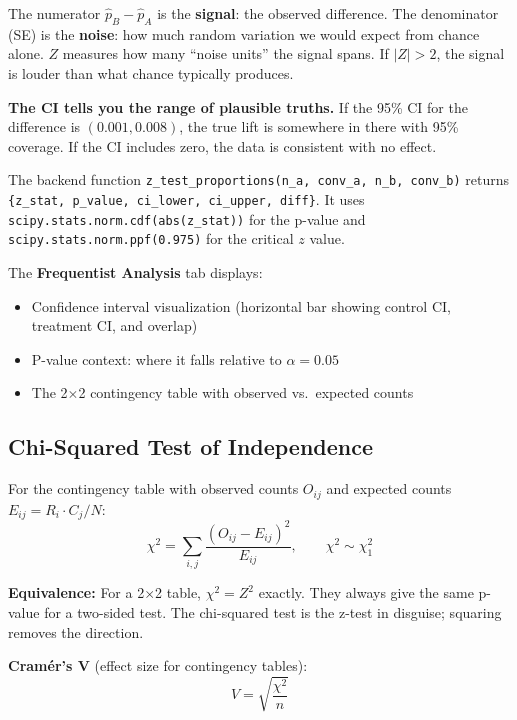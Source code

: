 \documentclass[11pt,a4paper]{article}
\newcommand{\code}[1]{\texttt{#1}}
\newcommand{\scipy}[1]{\texttt{scipy.stats.#1}}
\begin{document}
\vspace{8pt}

\begin{intuition}
The numerator $\hat{p}_B - \hat{p}_A$ is the \textbf{signal}: the observed difference. The denominator (SE) is the \textbf{noise}: how much random variation we would expect from chance alone. $Z$ measures how many ``noise units'' the signal spans. If $|Z| > 2$, the signal is louder than what chance typically produces.

\medskip
\textbf{The CI tells you the range of plausible truths.} If the 95\% CI for the difference is $(0.001, 0.008)$, the true lift is somewhere in there with 95\% coverage. If the CI includes zero, the data is consistent with no effect.
\end{intuition}

\vspace{8pt}

\begin{application}
The backend function \code{z\_test\_proportions(n\_a, conv\_a, n\_b, conv\_b)} returns \code{\{z\_stat, p\_value, ci\_lower, ci\_upper, diff\}}. It uses \scipy{norm.cdf(abs(z\_stat))} for the p-value and \scipy{norm.ppf(0.975)} for the critical $z$ value.

The \textbf{Frequentist Analysis} tab displays:
\begin{itemize}[nosep]
  \item Confidence interval visualization (horizontal bar showing control CI, treatment CI, and overlap)
  \item P-value context: where it falls relative to $\alpha = 0.05$
  \item The 2$\times$2 contingency table with observed vs.\ expected counts
\end{itemize}
\end{application}

\subsection{Chi-Squared Test of Independence}

\begin{formaldef}
For the contingency table with observed counts $O_{ij}$ and expected counts $E_{ij} = R_i \cdot C_j / N$:
\[
\chi^2 = \sum_{i,j} \frac{(O_{ij} - E_{ij})^2}{E_{ij}}, \qquad \chi^2 \sim \chi^2_1
\]

\textbf{Equivalence:} For a 2$\times$2 table, $\chi^2 = Z^2$ exactly. They always give the same p-value for a two-sided test. The chi-squared test is the z-test in disguise; squaring removes the direction.

\medskip
\textbf{Cram\'{e}r's V} (effect size for contingency tables):
\[
V = \sqrt{\frac{\chi^2}{n}}
\]
\end{formaldef}
\end{document}
